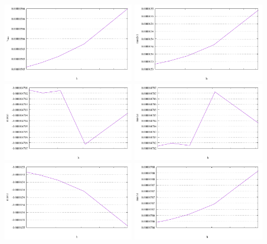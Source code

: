 \begin{center}
\includegraphics[width=5.7cm]{python_codes/fieldstone_18/results/block/vrms}
\includegraphics[width=5.7cm]{python_codes/fieldstone_18/results/block/max_vel}\\
\includegraphics[width=5.7cm]{python_codes/fieldstone_18/results/block/min_u}
\includegraphics[width=5.7cm]{python_codes/fieldstone_18/results/block/max_u}\\
\includegraphics[width=5.7cm]{python_codes/fieldstone_18/results/block/min_v}
\includegraphics[width=5.7cm]{python_codes/fieldstone_18/results/block/max_v}\\

\end{center}
